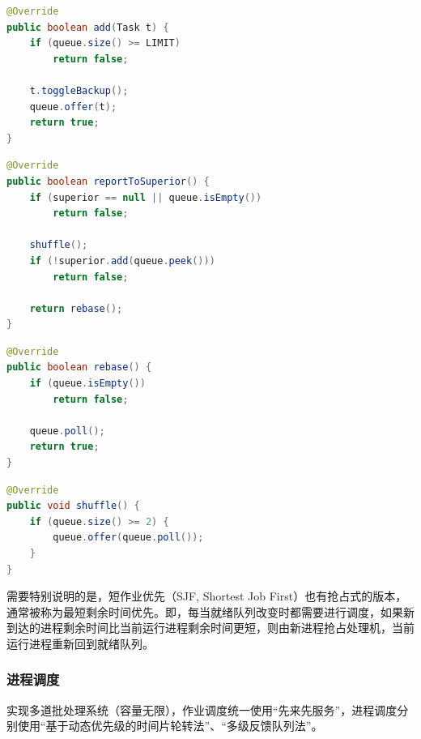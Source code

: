 \documentclass[UTF8]{ctexart}
\begin{document}
\begin{lstlisting}[language={java},caption={添加作业（收容状态）}]
@Override
public boolean add(Task t) {
    if (queue.size() >= LIMIT)
        return false;

    t.toggleBackup();
    queue.offer(t);
    return true;
}
\end{lstlisting}

\begin{lstlisting}[language={java},caption={模拟为作业创建进程，装填进入内存}]
@Override
public boolean reportToSuperior() {
    if (superior == null || queue.isEmpty())
        return false;

    shuffle();
    if (!superior.add(queue.peek()))
        return false;

    return rebase();
}
\end{lstlisting}

\begin{lstlisting}[language={java},caption={在本层队列中移除任务}]
@Override
public boolean rebase() {
    if (queue.isEmpty())
        return false;

    queue.poll();
    return true;
}
\end{lstlisting}

\begin{lstlisting}[language={java},caption={响应比动态变化，刷新队列顺序}]
@Override
public void shuffle() {
    if (queue.size() >= 2) {
        queue.offer(queue.poll());
    }
}
\end{lstlisting}

需要特别说明的是，短作业优先（SJF, Shortest Job First）也有抢占式的版本，通常被称为最短剩余时间优先。即，每当就绪队列改变时都需要进行调度，如果新到达的进程剩余时间比当前运行进程剩余时间更短，则由新进程抢占处理机，当前运行进程重新回到就绪队列。

\subsubsection{进程调度}
实现多道批处理系统（容量无限），作业调度统一使用“先来先服务”，进程调度分别使用“基于动态优先级的时间片轮转法”、“多级反馈队列法”。
\end{document}
